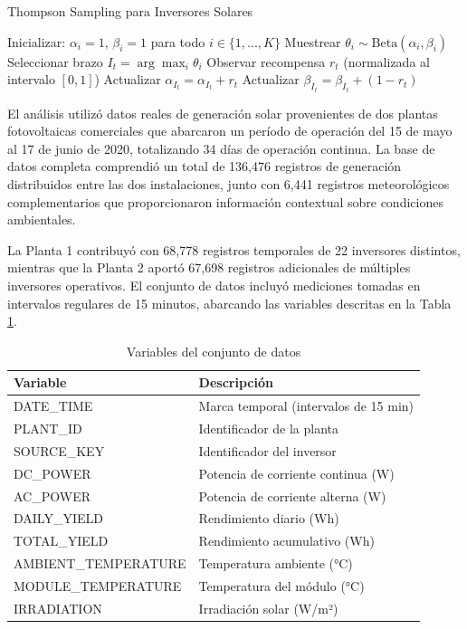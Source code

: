 \documentclass[12pt,a4paper]{article}
\begin{document}
\begin{algorithm}
\caption{Thompson Sampling para Inversores Solares}
\begin{algorithmic}[1]
\STATE Inicializar: $\alpha_i = 1$, $\beta_i = 1$ para todo $i \in \{1, ..., K\}$
\STATE Muestrear $\theta_i \sim \text{Beta}(\alpha_i, \beta_i)$
\ENDFOR
\STATE Seleccionar brazo $I_t = \arg \max_i \theta_i$
\STATE Observar recompensa $r_t$ (normalizada al intervalo $[0, 1]$)
\STATE Actualizar $\alpha_{I_t} = \alpha_{I_t} + r_t$
\STATE Actualizar $\beta_{I_t} = \beta_{I_t} + (1 - r_t)$
\ENDFOR
\end{algorithmic}
\end{algorithm}

El análisis utilizó datos reales de generación solar provenientes de dos plantas fotovoltaicas comerciales que abarcaron un período de operación del 15 de mayo al 17 de junio de 2020, totalizando 34 días de operación continua. La base de datos completa comprendió un total de 136,476 registros de generación distribuidos entre las dos instalaciones, junto con 6,441 registros meteorológicos complementarios que proporcionaron información contextual sobre condiciones ambientales.

La Planta 1 contribuyó con 68,778 registros temporales de 22 inversores distintos, mientras que la Planta 2 aportó 67,698 registros adicionales de múltiples inversores operativos. El conjunto de datos incluyó mediciones tomadas en intervalos regulares de 15 minutos, abarcando las variables descritas en la Tabla \ref{tab:variables}.

\begin{table}[h!]
\centering
\caption{Variables del conjunto de datos}
\label{tab:variables}
\begin{tabular}{@{}ll@{}}
\toprule
\textbf{Variable} & \textbf{Descripción} \\
\midrule
DATE\_TIME & Marca temporal (intervalos de 15 min) \\
PLANT\_ID & Identificador de la planta \\
SOURCE\_KEY & Identificador del inversor \\
DC\_POWER & Potencia de corriente continua (W) \\
AC\_POWER & Potencia de corriente alterna (W) \\
DAILY\_YIELD & Rendimiento diario (Wh) \\
TOTAL\_YIELD & Rendimiento acumulativo (Wh) \\
AMBIENT\_TEMPERATURE & Temperatura ambiente (°C) \\
MODULE\_TEMPERATURE & Temperatura del módulo (°C) \\
IRRADIATION & Irradiación solar (W/m²) \\
\bottomrule
\end{tabular}
\end{table}
\end{document}
